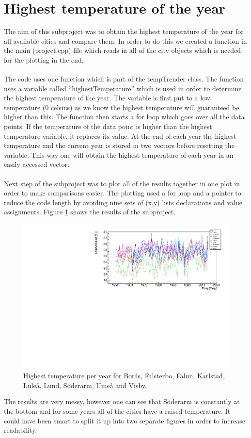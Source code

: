 \documentclass[../main.tex]{subfiles}
\begin{document}
\section{Highest temperature of the year}
	The aim of this subproject was to obtain the highest temperature of the year for all available cities and compare them. In order to do this we created a function in the 
	main (project.cpp) file which reads in all of the city objects which is needed for the plotting in the end.
	\\\\
	The code uses one function which is part of the tempTrender class. The function uses a variable called ``highestTemperature'' which is used in order to determine 
	the highest temperature of the year. The variable is first put to a low temperature (0 celsius) as we know the highest temperature will guaranteed be higher than this. 
	The function then starts a for loop which goes over all the data points. If the temperature of the data point is higher than the highest temperature variable, it 
	replaces its value. At the end of each year the highest temperature and the current year is stored in two vectors before resetting the variable. This way one will obtain 
	the highest temperature of each year in an easily accessed vector.
	\\\\
	Next step of the subproject was to plot all of the results together in one plot in order to make comparisons easier. The plotting used a for loop and a pointer to reduce 
	the code length by avoiding nine sets of (x,y) lists declarations and value assignments. Figure \ref{highestTemperature2} shows the results of the subproject.
	\begin{figure}[H]
	  \centering
	  \includegraphics[width = \textwidth]{hottestdaysallcities}
	  \caption{Highest temperature per year for Borås, Falsterbo, Falun, Karlstad, Luleå, Lund, Söderarm, Umeå and Visby.}
	  \label{highestTemperature2}
	\end{figure}\noindent
	The results are very messy, however one can see that Söderarm is constantly at the bottom and for some years all of the cities have a raised temperature. It could have 
	been smart to split it up into two separate figures in order to increase readability.
\end{document}
